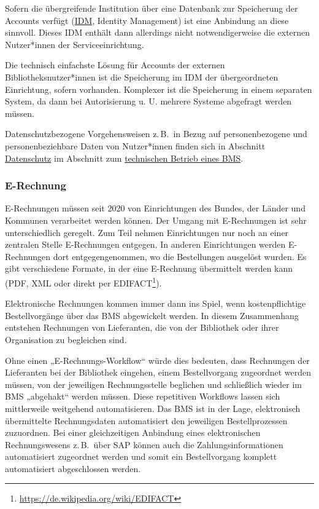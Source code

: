 \documentclass[
  11pt,
  letterpaper,
  DIV=11,
  twoside]{scrreprt}
\DeclareRobustCommand{\href}[2]{#2\footnote{\url{#1}}}
\begin{document}
Sofern die übergreifende Institution über eine Datenbank zur Speicherung
der Accounts verfügt (\hyperref[identity-management]{IDM}, Identity
Management) ist eine Anbindung an diese sinnvoll. Dieses IDM enthält
dann allerdings nicht notwendigerweise die externen Nutzer*innen der
Serviceeinrichtung.

Die technisch einfachste Lösung für Accounts der externen
Bibliotheksnutzer*innen ist die Speicherung im IDM der übergeordneten
Einrichtung, sofern vorhanden. Komplexer ist die Speicherung in einem
separaten System, da dann bei Autorisierung u. U. mehrere Systeme
abgefragt werden müssen.

Datenschutzbezogene Vorgehensweisen z.\,B.~in Bezug auf personenbezogene
und personenbeziehbare Daten von Nutzer*innen finden sich in Abschnitt
\hyperref[datenschutz-etc]{Datenschutz} im Abschnitt zum
\hyperref[sec-technischer-betrieb]{technischen Betrieb eines BMS}.

\subsubsection{E-Rechnung}\label{e-rechnung}

E-Rechnungen müssen seit 2020 von Einrichtungen des Bundes, der Länder
und Kommunen verarbeitet werden können. Der Umgang mit E-Rechnungen ist
sehr unterschiedlich geregelt. Zum Teil nehmen Einrichtungen nur noch an
einer zentralen Stelle E-Rechnungen entgegen. In anderen Einrichtungen
werden E-Rechnungen dort entgegengenommen, wo die Bestellungen ausgelöst
wurden. Es gibt verschiedene Formate, in der eine E-Rechnung übermittelt
werden kann (PDF, XML oder direkt per
\href{https://de.wikipedia.org/wiki/EDIFACT}{EDIFACT}).

Elektronische Rechnungen kommen immer dann ins Spiel, wenn
kostenpflichtige Bestellvorgänge über das BMS abgewickelt werden. In
diesem Zusammenhang entstehen Rechnungen von Lieferanten, die von der
Bibliothek oder ihrer Organisation zu begleichen sind.

Ohne einen „E-Rechnungs-Workflow`` würde dies bedeuten, dass Rechnungen
der Lieferanten bei der Bibliothek eingehen, einem Bestellvorgang
zugeordnet werden müssen, von der jeweiligen Rechnungsstelle beglichen
und schließlich wieder im BMS „abgehakt`` werden müssen. Diese
repetitiven Workflows lassen sich mittlerweile weitgehend
automatisieren. Das BMS ist in der Lage, elektronisch übermittelte
Rechnungsdaten automatisiert den jeweiligen Bestellprozessen zuzuordnen.
Bei einer gleichzeitigen Anbindung eines elektronischen Rechnungswesens
z.\,B.~über SAP können auch die Zahlungsinformationen automatisiert
zugeordnet werden und somit ein Bestellvorgang komplett automatisiert
abgeschlossen werden.
\end{document}
